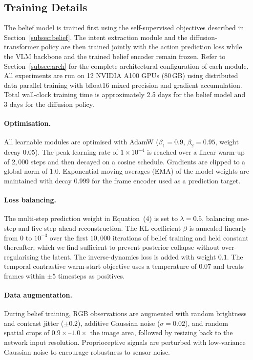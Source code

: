 \documentclass[12pt]{article}
\begin{document}
\subsection{Training Details}
\label{subsec:training_details}
The belief model is trained first using the self-supervised objectives described in Section~\ref{subsec:belief}. The intent extraction module and the diffusion-transformer policy are then trained jointly with the action prediction loss while the VLM backbone and the trained belief encoder remain frozen. Refer to Section~\ref{subsec:arch} for the complete architectural configuration of each module. All experiments are run on 12 NVIDIA A100 GPUs (80\,GB) using distributed data parallel training with bfloat16 mixed precision and gradient accumulation. Total wall-clock training time is approximately 2.5 days for the belief model and 3 days for the diffusion policy.

\paragraph{Optimisation.} All learnable modules are optimised with AdamW ($\beta_1 = 0.9$, $\beta_2 = 0.95$, weight decay $0.05$). The peak learning rate of $1\times 10^{-4}$ is reached over a linear warm-up of $2{,}000$ steps and then decayed on a cosine schedule. Gradients are clipped to a global norm of $1.0$. Exponential moving averages (EMA) of the model weights are maintained with decay $0.999$ for the frame encoder used as a prediction target.

\paragraph{Loss balancing.} The multi-step prediction weight in Equation~(4) is set to $\lambda = 0.5$, balancing one-step and five-step ahead reconstruction. The KL coefficient $\beta$ is annealed linearly from $0$ to $10^{-3}$ over the first $10{,}000$ iterations of belief training and held constant thereafter, which we find sufficient to prevent posterior collapse without over-regularising the latent. The inverse-dynamics loss is added with weight $0.1$. The temporal contrastive warm-start objective uses a temperature of $0.07$ and treats frames within $\pm 5$ timesteps as positives.

\paragraph{Data augmentation.} During belief training, RGB observations are augmented with random brightness and contrast jitter ($\pm 0.2$), additive Gaussian noise ($\sigma = 0.02$), and random spatial crops of $0.9\times$--$1.0\times$ the image area, followed by resizing back to the network input resolution. Proprioceptive signals are perturbed with low-variance Gaussian noise to encourage robustness to sensor noise.
\end{document}
